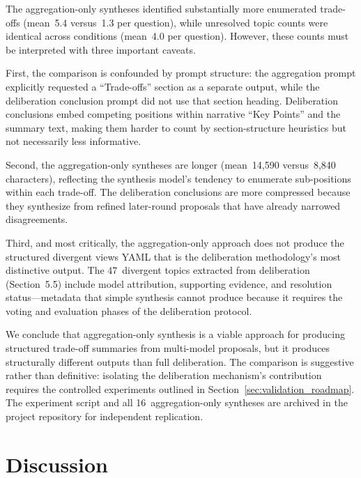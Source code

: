 \documentclass[11pt,a4paper]{article}
\begin{document}
The aggregation-only syntheses identified substantially more enumerated trade-offs (mean~5.4 versus~1.3 per question), while unresolved topic counts were identical across conditions (mean~4.0 per question). However, these counts must be interpreted with three important caveats.

First, the comparison is confounded by prompt structure: the aggregation prompt explicitly requested a ``Trade-offs'' section as a separate output, while the deliberation conclusion prompt did not use that section heading. Deliberation conclusions embed competing positions within narrative ``Key Points'' and the summary text, making them harder to count by section-structure heuristics but not necessarily less informative.

Second, the aggregation-only syntheses are longer (mean~14{,}590 versus~8{,}840 characters), reflecting the synthesis model's tendency to enumerate sub-positions within each trade-off. The deliberation conclusions are more compressed because they synthesize from refined later-round proposals that have already narrowed disagreements.

Third, and most critically, the aggregation-only approach does not produce the structured divergent views YAML that is the deliberation methodology's most distinctive output. The 47~divergent topics extracted from deliberation (Section~5.5) include model attribution, supporting evidence, and resolution status---metadata that simple synthesis cannot produce because it requires the voting and evaluation phases of the deliberation protocol.

We conclude that aggregation-only synthesis is a viable approach for producing structured trade-off summaries from multi-model proposals, but it produces structurally different outputs than full deliberation. The comparison is suggestive rather than definitive: isolating the deliberation mechanism's contribution requires the controlled experiments outlined in Section~\ref{sec:validation_roadmap}. The experiment script and all 16~aggregation-only syntheses are archived in the project repository for independent replication.

\section{Discussion}
\label{sec:discussion}
\end{document}
